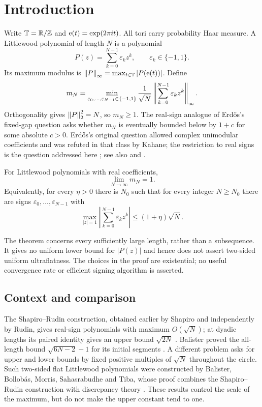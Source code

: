 \section{Introduction}\label{sec:introduction}
Write $\mathbb T=\mathbb R/\mathbb Z$ and $\mathrm e(t)=\exp(2\pi i t)$. All tori carry probability
Haar measure. A Littlewood polynomial of length $N$ is a polynomial
\[
 P(z)=\sum_{k=0}^{N-1}\varepsilon_k z^k,
 \qquad \varepsilon_k\in\{-1,1\}.
\]
Its maximum modulus is $\left\lVert P\right\rVert_\infty=\max_{t\in\mathbb T}|P(\mathrm e(t))|$.
Define
\[
 m_N=\min_{\varepsilon_0,\ldots,\varepsilon_{N-1}\in\{-1,1\}}
       \frac{1}{\sqrt N}\left\lVert \sum_{k=0}^{N-1}\varepsilon_k z^k\right\rVert_\infty.
\]
Orthogonality gives $\left\lVert P\right\rVert_2^2=N$, so $m_N\ge1$. The real-sign
analogue of Erd\H{o}s's fixed-gap question asks whether $m_N$ is
eventually bounded below by $1+c$ for some absolute $c>0$.
Erd\H{o}s's original question allowed complex unimodular coefficients
and was refuted in that class by Kahane; the restriction to real signs
is the question addressed here \cite[Problem~22]{Erdos1957}; see also
\cite{Kahane1980} and \cite[Problems~4.13 and~4.31]{HaymanLingham2018}.

\begin{theorem}\label{thm:main}
For Littlewood polynomials with real coefficients,
\[
 \lim_{N\to\infty}m_N=1.
\]
Equivalently, for every $\eta>0$ there is $N_0$ such that for every integer
$N\ge N_0$ there are signs $\varepsilon_0,\ldots,\varepsilon_{N-1}$ with
\[
 \max_{|z|=1}\left|\sum_{k=0}^{N-1}\varepsilon_kz^k\right|
 \le(1+\eta)\sqrt N.
\]
\end{theorem}

The theorem concerns every sufficiently large length, rather than a
subsequence. It gives no uniform lower bound for $|P(z)|$ and hence does
not assert two-sided uniform ultraflatness. The choices in the proof are
existential; no useful convergence rate or efficient signing algorithm
is asserted.

\subsection{Context and comparison}
The Shapiro--Rudin construction, obtained earlier by Shapiro and
independently by Rudin, gives real-sign polynomials
with maximum $O(\sqrt N)$; at dyadic lengths its paired identity gives
an upper bound $\sqrt{2N}$ \cite[Theorem~I and its proof]{Rudin1959}.
Balister proved the
all-length bound $\sqrt{6N-2}-1$ for its initial segments
\cite[Theorem 1]{Balister2019}. A different problem asks for upper and
lower bounds by fixed positive multiples of $\sqrt N$ throughout the
circle. Such two-sided flat Littlewood polynomials were constructed by
Balister, Bollob\'as, Morris, Sahasrabudhe and Tiba, whose proof combines
the Shapiro--Rudin construction with discrepancy theory
\cite{BalisterEtAl2020}. These results control the scale of the maximum,
but do not make the upper constant tend to one.


